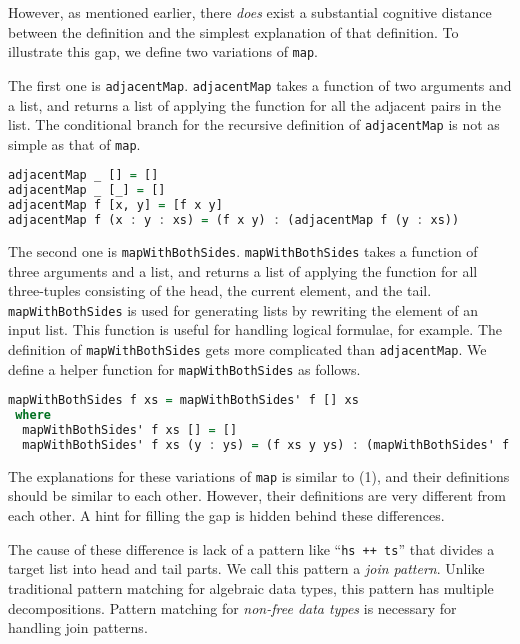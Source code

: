 \documentclass{article}
\newcommand{\todo}[1]{\textcolor{red}{(TODO: #1)}}
\begin{document}
\smallskip

However, as mentioned earlier, there \emph{does} exist a substantial cognitive distance between the definition and the simplest explanation of that definition.
To illustrate this gap, we define two variations of \texttt{map}.

The first one is \texttt{adjacentMap}.
\texttt{adjacentMap} takes a function of two arguments and a list, and returns a list of applying the function for all the adjacent pairs in the list.
The conditional branch for the recursive definition of \texttt{adjacentMap} is not as simple as that of \texttt{map}.


\begin{lstlisting}[language=haskell]
adjacentMap _ [] = []
adjacentMap _ [_] = []
adjacentMap f [x, y] = [f x y]
adjacentMap f (x : y : xs) = (f x y) : (adjacentMap f (y : xs))
\end{lstlisting}

The second one is \texttt{mapWithBothSides}.
\texttt{mapWithBothSides} takes a function of three arguments and a list, and returns a list of applying the function for all three-tuples consisting of the head, the current element, and the tail.
\texttt{mapWithBothSides} is used for generating lists by rewriting the element of an input list.
This function is useful for handling logical formulae, for example.
The definition of \texttt{mapWithBothSides} gets more complicated than \texttt{adjacentMap}.
We define a helper function for \texttt{mapWithBothSides} as follows.

\begin{lstlisting}[language=haskell]
mapWithBothSides f xs = mapWithBothSides' f [] xs
 where
  mapWithBothSides' f xs [] = []
  mapWithBothSides' f xs (y : ys) = (f xs y ys) : (mapWithBothSides' f (xs ++ [y]) ys)
\end{lstlisting}

The explanations for these variations of \texttt{map} is similar to (1), and their definitions should be similar to each other.
However, their definitions are very different from each other.
A hint for filling the gap is hidden behind these differences.

The cause of these difference is lack of a pattern like ``\texttt{hs ++ ts}'' that divides a target list into head and tail parts.
We call this pattern a \emph{join pattern}.
Unlike traditional pattern matching for algebraic data types, this pattern has multiple decompositions.
Pattern matching for \emph{non-free data types} is necessary for handling join patterns.
\end{document}
